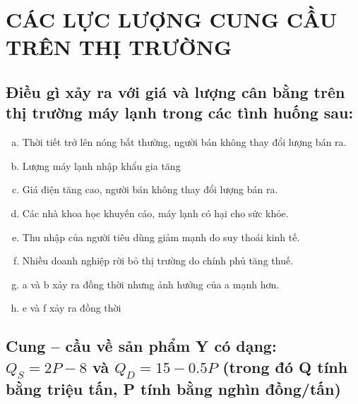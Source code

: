 \chapter{CÁC LỰC LƯỢNG 
CUNG CẦU TRÊN THỊ 
TRƯỜNG}

\section{Điều gì xảy ra với giá và lượng cân bằng trên thị trường máy lạnh trong các
  tình huống sau:}

\begin{enumerate}[(a)]
    \item Thời tiết trở lên nóng bất thường, người bán không thay đổi lượng bán ra.
    \item  Lượng máy lạnh nhập khẩu gia tăng
    \item  Giá điện tăng cao, người bán không thay đổi lượng bán ra.
    \item  Các nhà khoa học khuyến cáo, máy lạnh có hại cho sức khỏe.
    \item  Thu nhập của người tiêu dùng giảm mạnh do suy thoái kinh tế.
    \item  Nhiều doanh nghiệp rời bỏ thị trường do chính phủ tăng thuế.
    \item  a và b xảy ra đồng thời nhưng ảnh hưởng của a mạnh hơn.
    \item  e và f xảy ra đồng thời
\end{enumerate}

\section{Cung – cầu về sản phẩm Y có dạng: $Q_S = 2P - 8$ và $Q_D = 15 - 0.5P$
  (trong đó Q tính bằng triệu tấn, P tính bằng nghìn đồng/tấn)}

